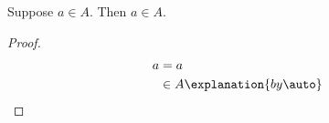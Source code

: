 \begin{proposition}\label{calculation_equality_hint}
    Suppose $a\in A$.
    Then $a\in A$.
\end{proposition}
\begin{proof}
    \begin{align*}
        a
            &= a
                \\
            &\in A
                \explanation{by \auto}
    \end{align*}
\end{proof}
